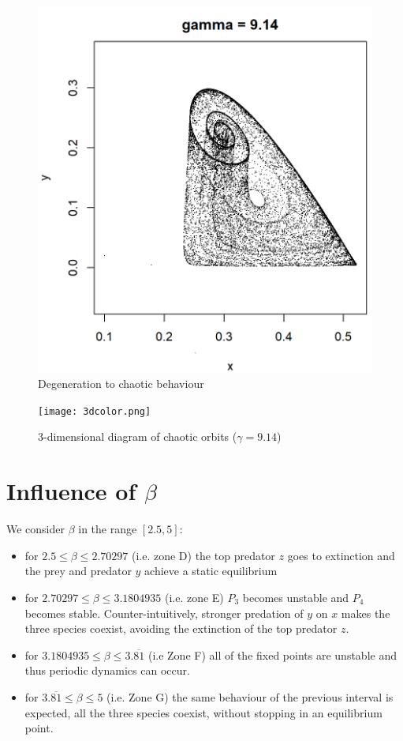 \documentclass[10pt]{Configuration_Files/PoliMi3i_thesis}
\begin{document}
\begin{figure}[H]
\endminipage\hfill
{}%
  \includegraphics[width=\linewidth]{images/Chapter 6.1/unnamed-chunk-12-1.png}
\endminipage
\caption{Degeneration to chaotic behaviour}
\label{fig:chaotic_behav}
\end{figure}

\begin{figure}[H]
\centering
\texttt{[image: 3dcolor.png]}
\caption{3-dimensional diagram of chaotic orbits ($\gamma=9.14$)}
\end{figure}

\section{Influence of $\beta$}

We consider $\beta$ in the range $[2.5, 5]$:

\begin{itemize}
    \item for $2.5\leq \beta \leq 2.70297$ (i.e. zone D) the top predator $z$ goes to extinction and the prey and predator $y$ achieve a static
equilibrium
    \item for $2.70297 \leq \beta \leq 3.1804935$ (i.e. zone E) $P_3$ becomes unstable and $P_4$ becomes stable. Counter-intuitively, stronger predation of $y$ on $x$ makes the three species coexist, avoiding the extinction of the top predator $z$.

    \item for $3.1804935 \leq \beta \leq 3.\overline{81}$ (i.e Zone F) all of the fixed points are unstable and thus periodic dynamics can occur.

    \item for $3.\overline{81} \leq \beta \leq5$ (i.e. Zone G) the same behaviour of the previous interval is expected, all the three species coexist, without stopping in an equilibrium point.
\end{itemize}
\end{document}

